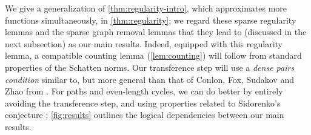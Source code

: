 \documentclass[reqno,11pt]{amsart}
\theoremstyle{definition}
\theoremstyle{remark}
\numberwithin{equation}{section}
\begin{document}
We give a generalization of \cref{thm:regularity-intro}, which approximates more functions simultaneously, in \cref{thm:regularity}; we regard these sparse regularity lemmas and the sparse graph removal lemmas that they lead to (discussed in the next subsection) as our main results. 
Indeed, equipped with this regularity lemma, a compatible counting lemma (\cref{lem:counting}) will follow from standard properties of the Schatten norms. Our transference step will use a \emph{dense pairs condition} similar to, but more general than that of Conlon, Fox, Sudakov and Zhao from \cite{conlon2021regularity}. For paths and even-length cycles, we can do better by entirely avoiding the transference step, and using properties related to Sidorenko's conjecture \cite{sidorenko1991inequalities}; \cref{fig:results} outlines the logical dependencies between our main results.
\end{document}
